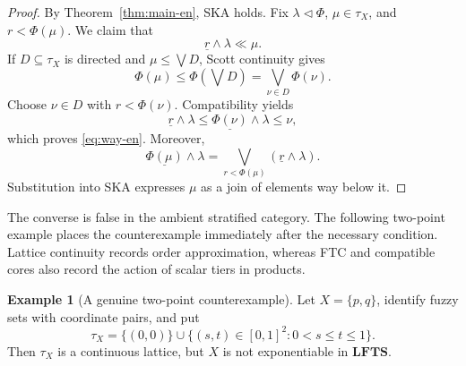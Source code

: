 \documentclass[11pt,a4paper]{article}
\numberwithin{equation}{section}
\theoremstyle{definition}
\newtheorem{example}[theorem]{Example}
\theoremstyle{remark}
\newcommand{\LFTS}{\mathbf{LFTS}}
\newcommand{\const}[1]{\underline{#1}}
\begin{document}
\begin{proof}
By Theorem~\ref{thm:main-en}, SKA holds.  Fix
\(\lambda\triangleleft\Phi\), \(\mu\in\tau_X\), and
\(r<\Phi(\mu)\).  We claim that
\begin{equation}\label{eq:way-en}
 \const r\wedge\lambda\ll\mu.
\end{equation}
If \(D\subseteq\tau_X\) is directed and
\(\mu\leq\bigvee D\), Scott continuity gives
\[
 \Phi(\mu)\leq\Phi(\bigvee D)
 =\bigvee_{\nu\in D}\Phi(\nu).
\]
Choose \(\nu\in D\) with \(r<\Phi(\nu)\).  Compatibility yields
\[
 \const r\wedge\lambda
 \leq\const{\Phi(\nu)}\wedge\lambda\leq\nu,
\]
which proves \eqref{eq:way-en}.  Moreover,
\[
 \const{\Phi(\mu)}\wedge\lambda
 =\bigvee_{r<\Phi(\mu)}(\const r\wedge\lambda).
\]
Substitution into SKA expresses \(\mu\) as a join of elements way below
it.
\end{proof}

The converse is false in the ambient stratified category.  The
following two-point example places the counterexample immediately after
the necessary condition.  Lattice continuity records order
approximation, whereas FTC and compatible cores also record the action
of scalar tiers in products.

\begin{example}[A genuine two-point counterexample]
\label{ex:two-en}
Let \(X=\{p,q\}\), identify fuzzy sets with coordinate pairs, and put
\begin{equation}\label{eq:two-top-en}
 \tau_X=\{(0,0)\}\cup
 \{(s,t)\in[0,1]^2:0<s\leq t\leq1\}.
\end{equation}
Then \(\tau_X\) is a continuous lattice, but \(X\) is not
exponentiable in \(\LFTS\).
\end{example}
\end{document}
